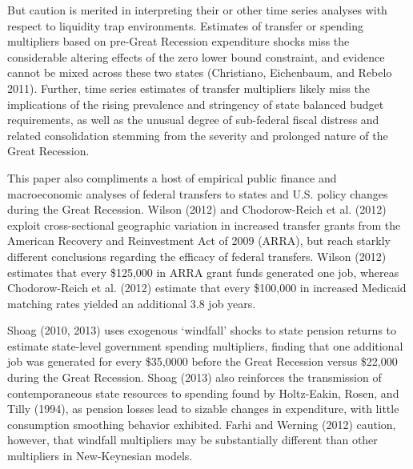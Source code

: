\documentclass[12pt,letterpaper]{article}
\begin{document}
But caution is merited in interpreting their or other time series analyses with respect to liquidity trap environments. Estimates of transfer or spending multipliers based on pre-Great Recession expenditure shocks miss the considerable altering effects of the zero lower bound constraint, and evidence cannot be mixed across these two states (Christiano, Eichenbaum, and Rebelo 2011). Further, time series estimates of transfer multipliers likely miss the implications of the rising prevalence and stringency of state balanced budget requirements, as well as the unusual degree of sub-federal fiscal distress and related consolidation stemming from the severity and prolonged nature of the Great Recession.
 
This paper also compliments a host of empirical public finance and macroeconomic analyses of federal transfers to states and U.S. policy changes during the Great Recession. Wilson (2012) and Chodorow-Reich et al. (2012) exploit cross-sectional geographic variation in increased transfer grants from the American Recovery and Reinvestment Act of 2009 (ARRA), but reach starkly different conclusions regarding the efficacy of federal transfers. Wilson (2012) estimates that every \$125,000 in ARRA grant funds generated one job, whereas Chodorow-Reich et al. (2012) estimate that every \$100,000 in increased Medicaid matching rates yielded an additional 3.8 job years. 

Shoag (2010, 2013) uses exogenous `windfall' shocks to state pension returns to estimate state-level government spending multipliers, finding that one additional job was generated for every \$35,0000 before the Great Recession versus \$22,000 during the Great Recession. Shoag (2013) also reinforces the transmission of contemporaneous state resources to spending found by Holtz-Eakin, Rosen, and Tilly (1994), as pension losses lead to sizable changes in expenditure, with little consumption smoothing behavior exhibited. Farhi and Werning (2012) caution, however, that windfall multipliers may be substantially different than other multipliers in New-Keynesian models.
\end{document}

